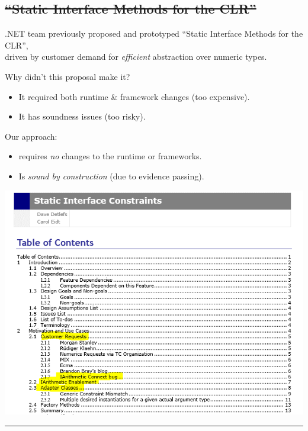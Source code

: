 \subsection{\texorpdfstring{\sout{``Static Interface Methods for the
CLR''}}{Static Interface Methods for the CLR}}\label{static-interface-methods-for-the-clr}

.NET team previously proposed and prototyped ``Static Interface Methods
for the CLR'',\\
driven by customer demand for \emph{efficient} abstraction over numeric
types.

Why didn't this proposal make it?

\begin{itemize}
\tightlist
\item
  It required both runtime \& framework changes (too expensive).
\item
  It has soundness issues (too risky).
\end{itemize}

Our approach:

\begin{itemize}
\tightlist
\item
  requires \emph{no} changes to the runtime or frameworks.
\item
  Is \emph{sound by construction} (due to evidence passing).
\end{itemize}

\includegraphics{./images/staticinterfaces.png}

\begin{center}\rule{0.5\linewidth}{\linethickness}\end{center}

